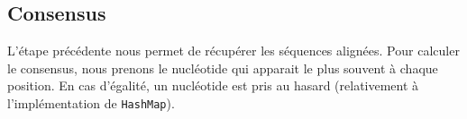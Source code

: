 \subsection{Consensus}
\label{subsection:consensus}

L'étape précédente nous permet de récupérer les séquences alignées. Pour 
calculer le consensus, nous prenons le nucléotide qui apparait le plus 
souvent à chaque position. En cas d'égalité, un nucléotide est pris au hasard 
(relativement à l'implémentation de \verb|HashMap|).
